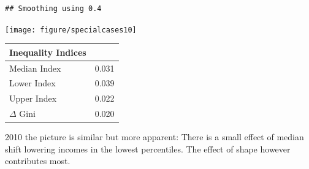 \documentclass[twoside]{article}\usepackage[]{graphicx}\usepackage[]{color}
\makeatletter
\newenvironment{kframe}{%
 \def\at@end@of@kframe{}%
 \ifinner\ifhmode%
  \def\at@end@of@kframe{\end{minipage}}%
  \begin{minipage}{\columnwidth}%
 \fi\fi%
 \def\FrameCommand##1{\hskip\@totalleftmargin \hskip-\fboxsep
 \colorbox{shadecolor}{##1}\hskip-\fboxsep
     \hskip-\linewidth \hskip-\@totalleftmargin \hskip\columnwidth}%
 \MakeFramed {\advance\hsize-\width
   \@totalleftmargin\z@ \linewidth\hsize
   \@setminipage}}%
 {\par\unskip\endMakeFramed%
 \at@end@of@kframe}
\newenvironment{knitrout}{}{} %
\makeatother
\begin{document}
\begin{multicols}{2}


\begin{knitrout}
\color{fgcolor}\begin{kframe}
\begin{verbatim}
## Smoothing using 0.4
\end{verbatim}
\end{kframe}
\texttt{[image: figure/specialcases10]} 

\end{knitrout}

%
\begin{center}
\begin{tabular}{ll}
\hline\hline
\multicolumn{1}{l}{Inequality Indices}&\multicolumn{1}{c}{}\tabularnewline
\hline
Median Index&0.031\tabularnewline
Lower Index&0.039\tabularnewline
Upper Index&0.022\tabularnewline
$\Delta$ Gini&0.020\tabularnewline
\hline
\end{tabular}
\end{center}



2010 the picture is similar but more apparent: There is a small effect of median shift lowering incomes in the lowest percentiles. The effect of shape however contributes most.







\end{multicols}
\end{document}
